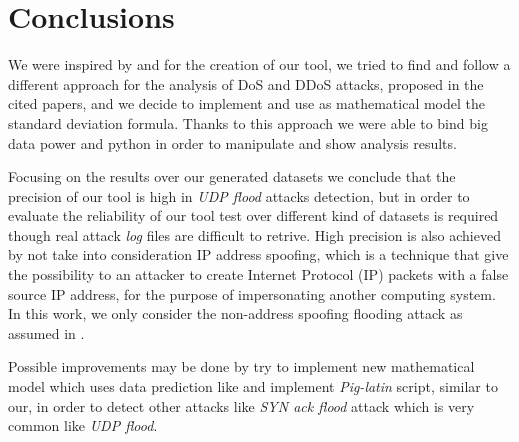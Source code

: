 \section{Conclusions}
We were inspired by \cite{detection_by_path_analaysis} and \cite{ddos_forensics} for the creation of our tool, we tried to find and follow a different approach for the analysis of DoS and DDoS attacks, proposed in the cited papers, and we decide to implement and use as mathematical model the standard deviation formula. Thanks to this approach we were able to bind big data power and python in order to manipulate and show analysis results.  

Focusing on the results over our generated datasets we conclude that the precision of our tool is high in \textit{UDP flood} attacks detection, but in order to evaluate the reliability of our tool test over different kind of datasets is required though real attack \textit{log} files are difficult to retrive. High precision is also achieved by not take into consideration IP address spoofing, which is a technique that give the possibility to an attacker to create Internet Protocol (IP) packets with a false source IP address, for the purpose of impersonating another computing system. In this work, we only consider the non-address spoofing flooding attack as assumed in \cite{ddos_forensics}. 

Possible improvements may be done by try to implement new mathematical model which uses data prediction like \cite{detection_by_path_analaysis} and implement \textit{Pig-latin} script, similar to our, in order to detect other attacks like \textit{SYN ack flood} attack which is very common like \textit{UDP flood}. 